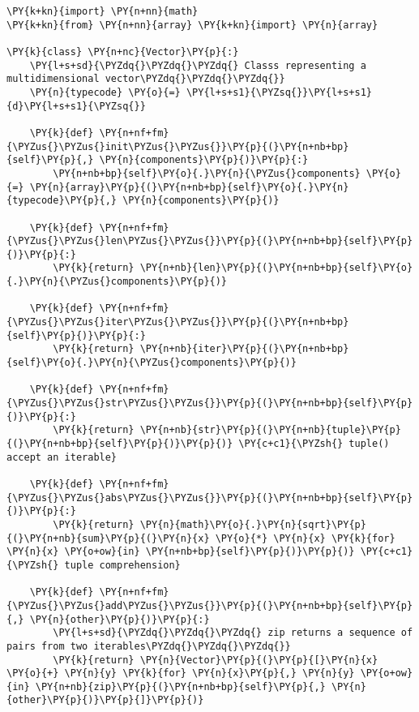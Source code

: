 \begin{Verbatim}[label=\makebox{\url{https://github.com/lucabaldini/cmepda/tree/master/slides/latex/snippets/vector\_ducked.py}},commandchars=\\\{\}]
\PY{k+kn}{import} \PY{n+nn}{math}
\PY{k+kn}{from} \PY{n+nn}{array} \PY{k+kn}{import} \PY{n}{array}

\PY{k}{class} \PY{n+nc}{Vector}\PY{p}{:}
    \PY{l+s+sd}{\PYZdq{}\PYZdq{}\PYZdq{} Classs representing a multidimensional vector\PYZdq{}\PYZdq{}\PYZdq{}}    
    \PY{n}{typecode} \PY{o}{=} \PY{l+s+s1}{\PYZsq{}}\PY{l+s+s1}{d}\PY{l+s+s1}{\PYZsq{}}
    
    \PY{k}{def} \PY{n+nf+fm}{\PYZus{}\PYZus{}init\PYZus{}\PYZus{}}\PY{p}{(}\PY{n+nb+bp}{self}\PY{p}{,} \PY{n}{components}\PY{p}{)}\PY{p}{:}
        \PY{n+nb+bp}{self}\PY{o}{.}\PY{n}{\PYZus{}components} \PY{o}{=} \PY{n}{array}\PY{p}{(}\PY{n+nb+bp}{self}\PY{o}{.}\PY{n}{typecode}\PY{p}{,} \PY{n}{components}\PY{p}{)}
    
    \PY{k}{def} \PY{n+nf+fm}{\PYZus{}\PYZus{}len\PYZus{}\PYZus{}}\PY{p}{(}\PY{n+nb+bp}{self}\PY{p}{)}\PY{p}{:}
        \PY{k}{return} \PY{n+nb}{len}\PY{p}{(}\PY{n+nb+bp}{self}\PY{o}{.}\PY{n}{\PYZus{}components}\PY{p}{)}    
    
    \PY{k}{def} \PY{n+nf+fm}{\PYZus{}\PYZus{}iter\PYZus{}\PYZus{}}\PY{p}{(}\PY{n+nb+bp}{self}\PY{p}{)}\PY{p}{:}
        \PY{k}{return} \PY{n+nb}{iter}\PY{p}{(}\PY{n+nb+bp}{self}\PY{o}{.}\PY{n}{\PYZus{}components}\PY{p}{)}
    
    \PY{k}{def} \PY{n+nf+fm}{\PYZus{}\PYZus{}str\PYZus{}\PYZus{}}\PY{p}{(}\PY{n+nb+bp}{self}\PY{p}{)}\PY{p}{:}
        \PY{k}{return} \PY{n+nb}{str}\PY{p}{(}\PY{n+nb}{tuple}\PY{p}{(}\PY{n+nb+bp}{self}\PY{p}{)}\PY{p}{)} \PY{c+c1}{\PYZsh{} tuple() accept an iterable}
    
    \PY{k}{def} \PY{n+nf+fm}{\PYZus{}\PYZus{}abs\PYZus{}\PYZus{}}\PY{p}{(}\PY{n+nb+bp}{self}\PY{p}{)}\PY{p}{:}
        \PY{k}{return} \PY{n}{math}\PY{o}{.}\PY{n}{sqrt}\PY{p}{(}\PY{n+nb}{sum}\PY{p}{(}\PY{n}{x} \PY{o}{*} \PY{n}{x} \PY{k}{for} \PY{n}{x} \PY{o+ow}{in} \PY{n+nb+bp}{self}\PY{p}{)}\PY{p}{)} \PY{c+c1}{\PYZsh{} tuple comprehension}
    
    \PY{k}{def} \PY{n+nf+fm}{\PYZus{}\PYZus{}add\PYZus{}\PYZus{}}\PY{p}{(}\PY{n+nb+bp}{self}\PY{p}{,} \PY{n}{other}\PY{p}{)}\PY{p}{:}
        \PY{l+s+sd}{\PYZdq{}\PYZdq{}\PYZdq{} zip returns a sequence of pairs from two iterables\PYZdq{}\PYZdq{}\PYZdq{}}
        \PY{k}{return} \PY{n}{Vector}\PY{p}{(}\PY{p}{[}\PY{n}{x} \PY{o}{+} \PY{n}{y} \PY{k}{for} \PY{n}{x}\PY{p}{,} \PY{n}{y} \PY{o+ow}{in} \PY{n+nb}{zip}\PY{p}{(}\PY{n+nb+bp}{self}\PY{p}{,} \PY{n}{other}\PY{p}{)}\PY{p}{]}\PY{p}{)}
    

\end{Verbatim}
